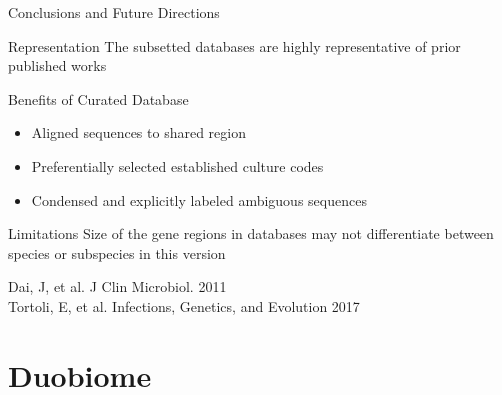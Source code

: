 \documentclass[11pt, xcolor=table]{beamer}
\begin{document}
	\begin{frame}{Conclusions and Future Directions}
	
	\begin{block}{Representation}
	The subsetted databases are highly representative of prior published works
	\end{block}
	
	\begin{block}{Benefits of Curated Database}
	\begin{itemize}
	\item Aligned sequences to shared region
	\item Preferentially selected established culture codes
	\item Condensed and explicitly labeled ambiguous sequences 
  \end{itemize}
	\end{block}
	
	\begin{block}{Limitations}
	Size of the gene regions in databases may not differentiate between species or subspecies in this version
	\end{block}
	
	\tiny{Dai, J, et al. J Clin Microbiol. 2011 \\ Tortoli, E, et al. Infections, Genetics, and Evolution 2017}
  \end{frame}

\section{Duobiome}
\subsection{}
\end{document}
